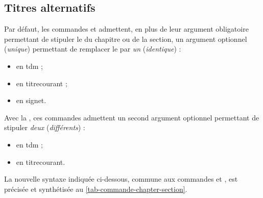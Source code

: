 \subsection{Titres alternatifs}
\label{sec-intit-altern}
%
%

Par défaut, les commandes  et 
admettent, en plus de leur argument obligatoire permettant de stipuler le
 du chapitre ou de la section, un argument optionnel (\emph{unique})
permettant de remplacer le  par \emph{un} 
(\emph{identique}) :
\begin{itemize}
\item en \gls{tdm} ;
\item en \gls{titrecourant} ;
\item en signet.
\end{itemize}

Avec la \yatCl{}, ces commandes admettent un second argument optionnel
permettant de stipuler \emph{deux} 
(\emph{différents}) :
\begin{itemize}
\item en \gls{tdm}\signet{} ;
\item en \gls{titrecourant}.
\end{itemize}
La nouvelle syntaxe indiquée ci-dessous, commune aux commandes 
et , est précisée et synthétisée au
\vref{tab-commande-chapter-section}.

